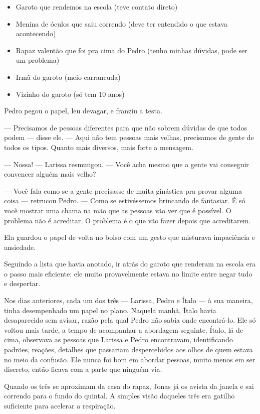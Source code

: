 \begin{itemize}
\item Garoto que rendemos na escola (teve contato direto)
\item Menina de óculos que saiu correndo (deve ter entendido o que estava acontecendo)
\item Rapaz valentão que foi pra cima do Pedro (tenho minhas dúvidas, pode ser um problema)
\item Irmã do garoto (meio carrancuda)
\item Vizinho do garoto (só tem 10 anos)
\end{itemize}

Pedro pegou o papel, leu devagar, e franziu a testa.

— Precisamos de pessoas diferentes para que não sobrem dúvidas de que todos podem — disse ele. — Aqui não tem pessoas mais velhas, precisamos de gente de todos os tipos. Quanto mais diversos, mais forte a mensagem.

— Nossa! — Larissa resmungou. — Você acha mesmo que a gente vai conseguir convencer alguém mais velho?

— Você fala como se a gente precisasse de muita ginástica pra provar alguma coisa — retrucou Pedro. — Como se estivéssemos brincando de fantasiar. É só você mostrar uma chama na mão que as pessoas vão ver que é possível.  
O problema não é acreditar.  
O problema é o que vão fazer depois que acreditarem.

Ela guardou o papel de volta no bolso com um gesto que misturava impaciência e ansiedade.

Seguindo a lista que havia anotado, ir atrás do garoto que renderam na escola era o passo mais eficiente: ele muito provavelmente estava no limite entre negar tudo e despertar.

Nos dias anteriores, cada um dos três — Larissa, Pedro e Ítalo — à sua maneira, tinha desempenhado um papel no plano. Naquela manhã, Ítalo havia desaparecido sem avisar, razão pela qual Pedro não sabia onde encontrá-lo. Ele só voltou mais tarde, a tempo de acompanhar a abordagem seguinte.
Ítalo, lá de cima, observava as pessoas que Larissa e Pedro encontravam, identificando padrões, reações, detalhes que passariam despercebidos aos olhos de quem estava no meio da confusão.
Ele nunca foi bom em abordar pessoas, muito menos em ser discreto, então ficava com a parte que ninguém via.

\bigskip

Quando os três se aproximam da casa do rapaz, Jonas já os avista da janela e sai correndo para o fundo do quintal.  
A simples visão daqueles três era gatilho suficiente para acelerar a respiração.

